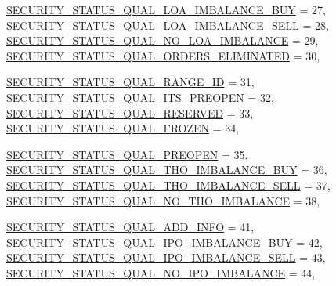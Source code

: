 \begin{CompactItemize}
\par
\hyperlink{namespaceWombat_2de6f22c731ba94169dc24b8054862b82bb80d56484fd8918478626f579eb9dd}{SECURITY\_\-STATUS\_\-QUAL\_\-LOA\_\-IMBALANCE\_\-BUY} =  27, 
\hyperlink{namespaceWombat_2de6f22c731ba94169dc24b8054862b80500298bac601b070bf89bea72288197}{SECURITY\_\-STATUS\_\-QUAL\_\-LOA\_\-IMBALANCE\_\-SELL} =  28, 
\hyperlink{namespaceWombat_2de6f22c731ba94169dc24b8054862b83c7167b07a28b22455a1f0280e60223e}{SECURITY\_\-STATUS\_\-QUAL\_\-NO\_\-LOA\_\-IMBALANCE} =  29, 
\hyperlink{namespaceWombat_2de6f22c731ba94169dc24b8054862b85028859ce918bb94c4a48dcc34d9ecfd}{SECURITY\_\-STATUS\_\-QUAL\_\-ORDERS\_\-ELIMINATED} =  30, 
\par
\hyperlink{namespaceWombat_2de6f22c731ba94169dc24b8054862b89492a61a291d640df654c72ec5a79b18}{SECURITY\_\-STATUS\_\-QUAL\_\-RANGE\_\-ID} =  31, 
\hyperlink{namespaceWombat_2de6f22c731ba94169dc24b8054862b8caa4130a825bb36422c4e01c182fcded}{SECURITY\_\-STATUS\_\-QUAL\_\-ITS\_\-PREOPEN} =  32, 
\hyperlink{namespaceWombat_2de6f22c731ba94169dc24b8054862b8a60106d37f41ed64c8d54f0afb598fba}{SECURITY\_\-STATUS\_\-QUAL\_\-RESERVED} =  33, 
\hyperlink{namespaceWombat_2de6f22c731ba94169dc24b8054862b81b2d2a48e8620acdd9b4445ce1e9860a}{SECURITY\_\-STATUS\_\-QUAL\_\-FROZEN} =  34, 
\par
\hyperlink{namespaceWombat_2de6f22c731ba94169dc24b8054862b8a50627b7c494aac57f544cb95b815f2b}{SECURITY\_\-STATUS\_\-QUAL\_\-PREOPEN} =  35, 
\hyperlink{namespaceWombat_2de6f22c731ba94169dc24b8054862b83ca3a847823047d0c66504177a5c0c24}{SECURITY\_\-STATUS\_\-QUAL\_\-THO\_\-IMBALANCE\_\-BUY} =  36, 
\hyperlink{namespaceWombat_2de6f22c731ba94169dc24b8054862b8d7211f2d649cc44977ff4e1f94807c83}{SECURITY\_\-STATUS\_\-QUAL\_\-THO\_\-IMBALANCE\_\-SELL} =  37, 
\hyperlink{namespaceWombat_2de6f22c731ba94169dc24b8054862b8389a4ea9f4392d4df6b631305f82473c}{SECURITY\_\-STATUS\_\-QUAL\_\-NO\_\-THO\_\-IMBALANCE} =  38, 
\par
\hyperlink{namespaceWombat_2de6f22c731ba94169dc24b8054862b80629caa07035d90cd24f594b1516cbb8}{SECURITY\_\-STATUS\_\-QUAL\_\-ADD\_\-INFO} =  41, 
\hyperlink{namespaceWombat_2de6f22c731ba94169dc24b8054862b825d57ffe5e24419f90e418ba07ce8698}{SECURITY\_\-STATUS\_\-QUAL\_\-IPO\_\-IMBALANCE\_\-BUY} =  42, 
\hyperlink{namespaceWombat_2de6f22c731ba94169dc24b8054862b87f07f80f970e7c7b1a59db6b289af2eb}{SECURITY\_\-STATUS\_\-QUAL\_\-IPO\_\-IMBALANCE\_\-SELL} =  43, 
\hyperlink{namespaceWombat_2de6f22c731ba94169dc24b8054862b88023f7662f3a1a22fd140803d89ada7e}{SECURITY\_\-STATUS\_\-QUAL\_\-NO\_\-IPO\_\-IMBALANCE} =  44, 
\par

\end{CompactItemize}
